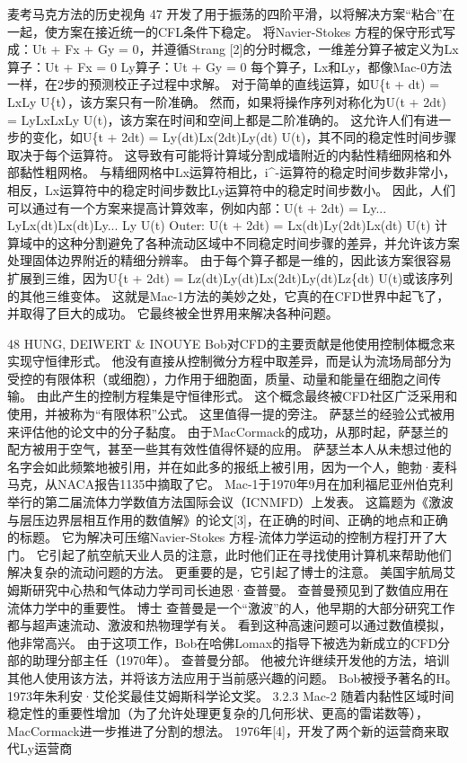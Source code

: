 \documentclass[UTF8,11pt,a4paper,openany,fontset=fandol]{ctexbook}
\begin{document}
麦考马克方法的历史视角 47 开发了用于振荡的四阶平滑，以将解决方案“粘合”在一起，使方案在接近统一的CFL条件下稳定。 将Navier-Stokes 方程的保守形式写成：Ut + Fx + Gy = 0，并遵循Strang [2]的分时概念，一维差分算子被定义为Lx算子：Ut + Fx = 0 Ly算子：Ut + Gy = 0 每个算子，Lx和Ly，都像Mac-0方法一样，在2步的预测校正子过程中求解。 对于简单的直线运算，如U\{t + dt) = LxLy U\{t），该方案只有一阶准确。 然而，如果将操作序列对称化为U(t + 2dt) = LyLxLxLy U(t)，该方案在时间和空间上都是二阶准确的。 这允许人们有进一步的变化，如U\{t + 2dt) = Ly(dt)Lx(2dt)Ly(dt) U(t)，其不同的稳定性时间步骤取决于每个运算符。 这导致有可能将计算域分割成墙附近的内黏性精细网格和外部黏性粗网格。 与精细网格中Lx运算符相比，i\textasciicircum{}-运算符的稳定时间步数非常小，相反，Lx运算符中的稳定时间步数比Ly运算符中的稳定时间步数小。 因此，人们可以通过有一个方案来提高计算效率，例如内部：U(t + 2dt) = Ly... LyLx(dt)Lx(dt)Ly... Ly U(t) Outer: U(t + 2dt) = Lx(dt)Ly(2dt)Lx(dt) U(t) 计算域中的这种分割避免了各种流动区域中不同稳定时间步骤的差异，并允许该方案处理固体边界附近的精细分辨率。 由于每个算子都是一维的，因此该方案很容易扩展到三维，因为U\{t + 2dt) = Lz(dt)Ly(dt)Lx(2dt)Ly(dt)Lz\{dt) U(t)或该序列的其他三维变体。 这就是Mac-1方法的美妙之处，它真的在CFD世界中起飞了，并取得了巨大的成功。 它最终被全世界用来解决各种问题。

48 HUNG, DEIWERT \& INOUYE Bob对CFD的主要贡献是他使用控制体概念来实现守恒律形式。 他没有直接从控制微分方程中取差异，而是认为流场局部分为受控的有限体积（或细胞），力作用于细胞面，质量、动量和能量在细胞之间传输。 由此产生的控制方程集是守恒律形式。 这个概念最终被CFD社区广泛采用和使用，并被称为“有限体积”公式。 这里值得一提的旁注。 萨瑟兰的经验公式被用来评估他的论文中的分子黏度。 由于MacCormack的成功，从那时起，萨瑟兰的配方被用于空气，甚至一些其有效性值得怀疑的应用。 萨瑟兰本人从未想过他的名字会如此频繁地被引用，并在如此多的报纸上被引用，因为一个人，鲍勃·麦科马克，从NACA报告1135中摘取了它。 Mac-1于1970年9月在加利福尼亚州伯克利举行的第二届流体力学数值方法国际会议（ICNMFD）上发表。 这篇题为《激波与层压边界层相互作用的数值解》的论文[3]，在正确的时间、正确的地点和正确的标题。 它为解决可压缩Navier-Stokes 方程-流体力学运动的控制方程打开了大门。 它引起了航空航天业人员的注意，此时他们正在寻找使用计算机来帮助他们解决复杂的流动问题的方法。 更重要的是，它引起了博士的注意。 美国宇航局艾姆斯研究中心热和气体动力学司司长迪恩·查普曼。 查普曼预见到了数值应用在流体力学中的重要性。 博士 查普曼是一个“激波”的人，他早期的大部分研究工作都与超声速流动、激波和热物理学有关。 看到这种高速问题可以通过数值模拟，他非常高兴。 由于这项工作，Bob在哈佛Lomax的指导下被选为新成立的CFD分部的助理分部主任（1970年）。 查普曼分部。 他被允许继续开发他的方法，培训其他人使用该方法，并将该方法应用于当前感兴趣的问题。 Bob被授予著名的H。 1973年朱利安·艾伦奖最佳艾姆斯科学论文奖。 3.2.3 Mac-2 随着内黏性区域时间稳定性的重要性增加（为了允许处理更复杂的几何形状、更高的雷诺数等），MacCormack进一步推进了分割的想法。 1976年[4]，开发了两个新的运营商来取代Ly运营商
\end{document}
